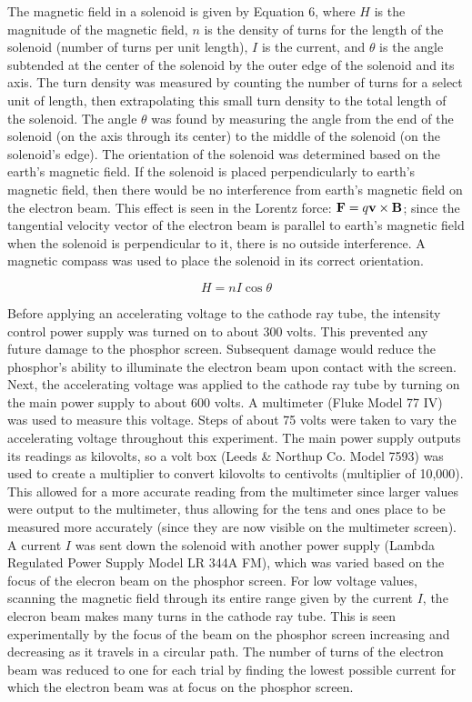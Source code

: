 \documentclass[%
 aip,
 amsmath,amssymb,
 reprint,%
floatfix,
]{revtex4-1}
\begin{document}
The magnetic field in a solenoid is given by Equation 6, where $H$ is the magnitude of the magnetic field, $n$ is the density of turns for the length of the solenoid (number of turns per unit length), $I$ is the current, and $\theta$ is the angle subtended at the center of the solenoid by the outer edge of the solenoid and its axis\cite{oxymanual}. The turn density was measured by counting the number of turns for a select unit of length, then extrapolating this small turn density to the total length of the solenoid. The angle $\theta$ was found by measuring the angle from the end of the solenoid (on the axis through its center) to the middle of the solenoid (on the solenoid's edge). The orientation of the solenoid was determined based on the earth's magnetic field. If the solenoid is placed perpendicularly to earth's magnetic field, then there would be no interference from earth's magnetic field on the electron beam. This effect is seen in the Lorentz force: $\bold{F} = q\bold{v} \times \bold{B}$; since the tangential velocity vector of the electron beam is parallel to earth's magnetic field when the solenoid is perpendicular to it, there is no outside interference. A magnetic compass was used to place the solenoid in its correct orientation.

\begin{equation}
	H = nI\cos{\theta}
\end{equation}

Before applying an accelerating voltage to the cathode ray tube, the intensity control power supply was turned on to about 300 volts. This prevented any future damage to the phosphor screen. Subsequent damage would reduce the phosphor's ability to illuminate the electron beam upon contact with the screen. Next, the accelerating voltage was applied to the cathode ray tube by turning on the main power supply to about 600 volts. A multimeter (Fluke Model 77 IV) was used to measure this voltage. Steps of about 75 volts were taken to vary the accelerating voltage throughout this experiment. The main power supply outputs its readings as kilovolts, so a volt box (Leeds \& Northup Co. Model 7593) was used to create a multiplier to convert kilovolts to centivolts (multiplier of 10,000). This allowed for a more accurate reading from the multimeter since larger values were output to the multimeter, thus allowing for the tens and ones place to be measured more accurately (since they are now visible on the multimeter screen). A current $I$ was sent down the solenoid with another power supply (Lambda Regulated Power Supply Model LR 344A FM), which was varied based on the focus of the elecron beam on the phosphor screen. For low voltage values, scanning the magnetic field through its entire range given by the current $I$, the elecron beam makes many turns in the cathode ray tube. This is seen experimentally by the focus of the beam on the phosphor screen increasing and decreasing as it travels in a circular path. The number of turns of the electron beam was reduced to one for each trial by finding the lowest possible current for which the electron beam was at focus on the phosphor screen.
\end{document}

